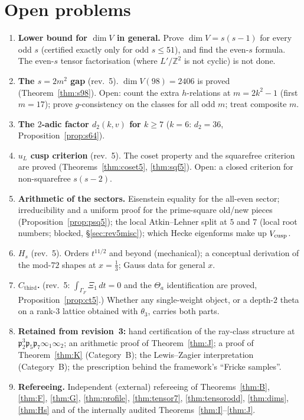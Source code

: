 \documentclass[11pt]{article}
\theoremstyle{definition}
\theoremstyle{plain}
\newcommand{\Z}{\mathbb{Z}}
\newcommand{\fp}{\mathfrak{p}}
\newcommand{\Cthird}{C_{\mathrm{third}}}
\begin{document}
\section{Open problems}\label{sec:open}
\begin{enumerate}[leftmargin=2em]
\item \textbf{Lower bound for $\dim V$ in general.} Prove $\dim V=s(s-1)$ for every odd $s$ (certified exactly only for odd $s\le51$), and find the even-$s$
formula. The even-$s$ tensor factorisation (where $L'/\Z^2$ is not cyclic) is not done.
\item \textbf{The $s=2m^2$ gap} (rev.~5). $\dim V(98)=2406$ is proved (Theorem~\ref{thm:s98}). Open: count the extra $h$-relations at $m=2k^2-1$ (first $m=17$); prove $g$-consistency on the classes for all odd $m$; treat composite $m$.
\item \textbf{The $2$-adic factor $d_2(k,v)$ for $k\ge7$} ($k=6$: $d_2=36$, Proposition~\ref{prop:s64}).
\item \textbf{$u_L$ cusp criterion} (rev.~5). The coset property and the squarefree criterion are proved (Theorems~\ref{thm:coset5}, \ref{thm:sqf5}). Open: a closed criterion for non-squarefree $s(s-2)$.
\item \textbf{Arithmetic of the sectors.} Eisenstein equality for the all-even sector; irreducibility and a uniform proof for the prime-square old/new pieces (Proposition~\ref{prop:psq5}); the local Atkin--Lehner split at $5$ and $7$ (local root numbers; blocked, \S\ref{sec:rev5misc}); which Hecke eigenforms make up $V_{\rm cusp}$.
\item \textbf{$H_s$} (rev.~5). Orders $t^{11/2}$ and beyond (mechanical); a conceptual derivation of the mod-$72$ shapes at $x=\tfrac13$; Gauss data for general $x$.
\item \textbf{$\Cthird$.} (rev.~5: $\int_{\Gamma_F}\Xi_1\,dt=0$ and the $\Theta_a$ identification are proved, Proposition~\ref{prop:ct5}.) Whether any single-weight object, or a depth-$2$ theta on a rank-$3$ lattice obtained with $\theta_3$, carries both parts.
\item \textbf{Retained from revision~3:} hand certification of the ray-class structure at $\fp_2^3\fp_5\fp_7\infty_1\infty_2$; an arithmetic proof of
Theorem~\ref{thm:J}; a proof of Theorem~\ref{thm:K} (Category~B); the Lewis--Zagier interpretation (Category~B); the prescription behind the framework's
``Fricke samples''.
\item \textbf{Refereeing.} Independent (external) refereeing of Theorems~\ref{thm:B}, \ref{thm:F}, \ref{thm:G}, \ref{thm:profile}, \ref{thm:tensor7},
\ref{thm:tensorodd}, \ref{thm:dims}, \ref{thm:Hs} and of the internally audited Theorems~\ref{thm:I}--\ref{thm:J}.
\end{enumerate}
\end{document}
